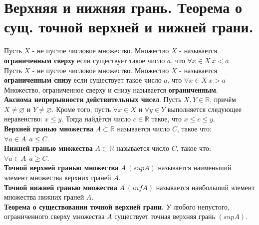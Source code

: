 \documentclass[12pt]{article}
\begin{document}
\section{Верхняя и нижняя грань. Теорема о сущ. точной верхней и нижней грани.
}
Пусть $X$ - не пустое числовое множество. Множество $X$ - называется \textbf{ограниченным сверху} если существует такое число $a$, что $\forall x \in X \ x < a$ \\
Пусть $X$ - не пустое числовое множество. Множество $X$ - называется \textbf{ограниченным снизу} если существует такое число $a$, что $\forall x \in X \ x > a$ \\
Множество, ограниченное сверху и снизу называется \textbf{ограниченным}.\\
\textbf{Аксиома непрерывности действительных чисел}. Пусть $X, Y \in \mathbb{R}$, причём $X \neq \varnothing$ и $Y \neq \varnothing$. Кроме того, пусть $\forall x \in X$ и $\forall y \in Y$ выполняется следующее неравенство: $x \leq y$. Тогда найдётся число $c \in \mathbb{R}$ такое, что $x \leq c \leq y$. \\
\textbf{Верхней гранью множества} $A \subset \mathbb{R}$ называется число $C$, такое что: $\forall a \in A \ \ a \leq C$. \\
\textbf{Нижней гранью множества} $A \subset \mathbb{R}$ называется число $C$, такое что: $\forall a \in A \ \ a \geq C$. \\
\textbf{Точной верхней гранью множества} $A \  (sup A)$ называется наименьший элемент множества верхних граней $A$. \\
\textbf{Точной нижней гранью множества} $A \  (inf A)$ называется наибольший элемент множества нижних граней $A$. \\
\textbf{Теорема о существовании точной верхней грани.} У любого непустого, ограниченного сверху множества $A$ существует точная верхняя грань $(supA)$.
\end{document}
